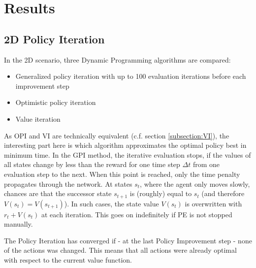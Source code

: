 \chapter{Results}
\label{chapter6}

\section{2D Policy Iteration}
\label{sec:results2d}
In the 2D scenario, three Dynamic Programming algorithms are compared:

\begin{itemize}
	\item Generalized policy iteration with up to 100 evaluation iterations before each improvement step
	\item Optimistic policy iteration
	\item Value iteration
\end{itemize}

As OPI and VI are technically equivalent (c.f. section \ref{subsection:VI}), the interesting part here is which algorithm approximates the optimal policy best in minimum time. In the GPI method, the iterative evaluation stops, if the values of all states change by less than the reward for one time step $\Delta t$ from one evaluation step to the next. When this point is reached, only the time penalty propagates through the network. At states $s_t$, where the agent only moves slowly, chances are that the successor state $s_{t+1}$ is (roughly) equal to $s_t$ (and therefore $V(s_t)=V(s_{t+1})$). In such cases, the state value $V(s_t)$ is overwritten with $r_t + V(s_t)$ at each iteration. This goes on indefinitely if PE is not stopped manually.

The Policy Iteration has converged if - at the last Policy Improvement step - none of the actions was changed. This means that all actions were already optimal with respect to the current value function. 

\dataOPTI

\dataDP

